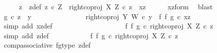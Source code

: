 \begin{isabellebody}
\ \ \isamarkupfalse%
\ \isamarkupfalse%
\ z\ \ z{\isacharunderscore}{\kern0pt}def{\isacharcolon}{\kern0pt}\ {\isachardoublequoteopen}z\ {\isasymin}\isactrlsub c\ Z\ {\isasymand}\ right{\isacharunderscore}{\kern0pt}coproj\ X\ Z\ {\isasymcirc}\isactrlsub c\ z\ {\isacharequal}{\kern0pt}\ xz{\isachardoublequoteclose}\isanewline
\ \ \ \ \isamarkupfalse%
\ xz{\isacharunderscore}{\kern0pt}form\ \isamarkupfalse%
\ blast\isanewline
\ \ \isamarkupfalse%
\ {\isachardoublequoteopen}g\ {\isasymcirc}\isactrlsub c\ z\ {\isacharequal}{\kern0pt}\ y{\isachardoublequoteclose}\isanewline
\ \ \ \ \isamarkupfalse%
\ {\isacharminus}{\kern0pt}\ \isanewline
\ \ \ \ \ \ \isamarkupfalse%
\ {\isachardoublequoteopen}right{\isacharunderscore}{\kern0pt}coproj\ Y\ W\ {\isasymcirc}\isactrlsub c\ y\ {\isacharequal}{\kern0pt}\ {\isacharparenleft}{\kern0pt}f\ {\isasymbowtie}\isactrlsub f\ g{\isacharparenright}{\kern0pt}\ {\isasymcirc}\isactrlsub c\ xz{\isachardoublequoteclose}\isanewline
\ \ \ \ \ \ \ \ \isamarkupfalse%
\ {\isacharparenleft}{\kern0pt}simp\ add{\isacharcolon}{\kern0pt}\ xz{\isacharunderscore}{\kern0pt}def{\isacharparenright}{\kern0pt}\ \ \ \ \ \ \ \ \ \isanewline
\ \ \ \ \ \ \isamarkupfalse%
\ \isamarkupfalse%
\ {\isachardoublequoteopen}{\isachardot}{\kern0pt}{\isachardot}{\kern0pt}{\isachardot}{\kern0pt}\ {\isacharequal}{\kern0pt}\ {\isacharparenleft}{\kern0pt}f\ {\isasymbowtie}\isactrlsub f\ g{\isacharparenright}{\kern0pt}\ {\isasymcirc}\isactrlsub c\ right{\isacharunderscore}{\kern0pt}coproj\ X\ Z\ {\isasymcirc}\isactrlsub c\ z{\isachardoublequoteclose}\isanewline
\ \ \ \ \ \ \ \ \isamarkupfalse%
\ {\isacharparenleft}{\kern0pt}simp\ add{\isacharcolon}{\kern0pt}\ z{\isacharunderscore}{\kern0pt}def{\isacharparenright}{\kern0pt}\isanewline
\ \ \ \ \ \ \isamarkupfalse%
\ \isamarkupfalse%
\ {\isachardoublequoteopen}{\isachardot}{\kern0pt}{\isachardot}{\kern0pt}{\isachardot}{\kern0pt}\ {\isacharequal}{\kern0pt}\ {\isacharparenleft}{\kern0pt}{\isacharparenleft}{\kern0pt}f\ {\isasymbowtie}\isactrlsub f\ g{\isacharparenright}{\kern0pt}\ {\isasymcirc}\isactrlsub c\ right{\isacharunderscore}{\kern0pt}coproj\ X\ Z{\isacharparenright}{\kern0pt}\ {\isasymcirc}\isactrlsub c\ z{\isachardoublequoteclose}\isanewline
\ \ \ \ \ \ \ \ \isamarkupfalse%
\ comp{\isacharunderscore}{\kern0pt}associative{}\ fg{\isacharunderscore}{\kern0pt}type\ z{\isacharunderscore}{\kern0pt}def\ \isamarkupfalse%

\end{isabellebody}
